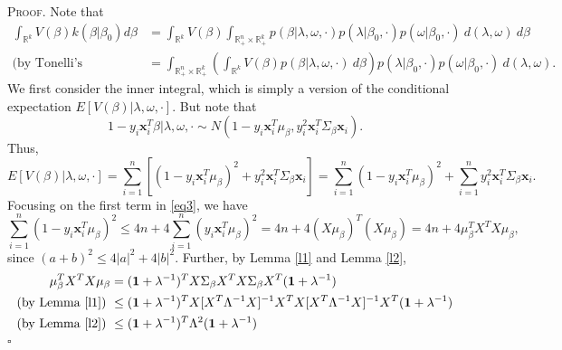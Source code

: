 \documentclass[12pt]{article}
\newcounter{ProofCounter}
\newenvironment{Proof}{\stepcounter{ProofCounter}\textsc{Proof.}}{\hfill$\square$}
\begin{document}
\begin{Proof}
  Note that 
  \begin{align}
    \int_{\mathbb{R}^{k}} V(\beta) k(\beta|\beta_0)d\beta & = \int_{\mathbb{R}^{k}}V(\beta) \int_{\mathbb{R}^{n}_+\times \mathbb{R}^{k}_+}
    p(\beta|\lambda,\omega, \cdot)p(\lambda|\beta_0, \cdot)p(\omega|\beta_0, \cdot)\ d(\lambda, \omega)\ d\beta \nonumber \\
    \text{(by Tonelli's Theorem)} \ & = \int_{\mathbb{R}^{n}_+\times\mathbb{R}^{k}_+} \left( \int_{\mathbb{R}^{k}} V(\beta)p(\beta|\lambda, \omega,
    \cdot)\ d\beta \right) p(\lambda|\beta_0,\cdot)p(\omega|\beta_0, \cdot)\ d(\lambda, \omega).
    \label{eq0}
  \end{align}
  We first consider the inner integral, which is simply a version of the conditional expectation $E[V(\beta)|\lambda,\omega,\cdot]$.
  But note that 
  \begin{equation*}
    1 - y_i\bm{x}_i^T\beta | \lambda, \omega, \cdot \sim N\left( 1 - y_i\bm{x}_i^T\mu_{\beta}, y_i^2 \bm{x}_i^T \Sigma_{\beta}\bm{x}_i\right).
    \label{eq2}
  \end{equation*}
  Thus,
  \begin{equation}
    E[V(\beta)|\lambda,\omega,\cdot] = \sum_{i=1}^{n}\left[(1 - y_i\bm{x}_i^T\mu_{\beta})^2 + y_i^2 \bm{x}_i^T \Sigma_{\beta} \bm{x}_i\right] = \sum_{i=1}^{n}
    (1 - y_i\bm{x}_i^T\mu_{\beta})^2 + \sum_{i=1}^{n}y_i^2\bm{x}_i^T\Sigma_{\beta}\bm{x}_i.
    \label{eq3}
  \end{equation}
  Focusing on the first term in \eqref{eq3}, we have 
  \begin{equation}
    \sum_{i=1}^{n}(1 - y_i \bm{x}_i^T \mu_{\beta})^2 \leq 4n + 4\sum_{i=1}^{n}(y_i\bm{x}_i^T \mu_{\beta})^2 = 4n + 4(X\mu_{\beta})^T (X\mu_{\beta}) 
    = 4n + 4\mu_{\beta}^T X^T X \mu_{\beta},
    \label{eq4}
  \end{equation}
  since $(a + b)^2 \leq 4|a|^2 + 4|b|^2$. Further, by Lemma \ref{l1} and Lemma \ref{l2},
  \begin{align}
    \mu_{\beta}^T X^T X \mu_{\beta} & = (\bm{1} + \lambda^{-1})^T X \Sigma_{\beta}X^T X\Sigma_{\beta} X^T (\bm{1} + \lambda^{-1}) \nonumber \\
    \text{(by Lemma \ref{l1})}\ & \leq (\bm{1} + \lambda^{-1})^T X[X^T\Lambda^{-1}X]^{-1}X^T X[X^T\Lambda^{-1}X]^{-1}X^T (\bm{1} + \lambda^{-1}) \nonumber \\
    \text{(by Lemma \ref{l2})}\ & \leq (\bm{1} + \lambda^{-1})^T \Lambda^{2} (\bm{1} + \lambda^{-1})\nonumber \\

\end{align}
\end{Proof}
\end{document}
